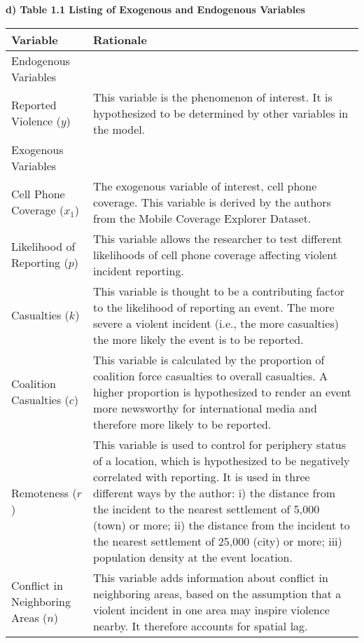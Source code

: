 \documentclass{report}
\begin{document}
\textbf{d) Table 1.1 Listing of Exogenous and Endogenous Variables}\\
\begin{tabular}{p{4cm}p{13cm} }
Variable & Rationale  \\
\hline
Endogenous Variables & \\
\hline
Reported Violence ($y$) & This variable is the phenomenon of interest. It is hypothesized to be determined by other variables in the model. \\

Exogenous Variables& \\
\hline

Cell Phone Coverage ($x_1$) & The exogenous variable of interest, cell phone coverage. This variable is derived by the authors from the Mobile Coverage Explorer Dataset. \\
Likelihood of Reporting ($p$) & This variable allows the researcher to test different likelihoods of cell phone coverage affecting violent incident reporting. \\
Casualties ($k$) & This variable is thought to be a contributing factor to the likelihood of reporting an event. The more severe a violent incident (i.e., the more casualties) the more likely the event is to be reported. \\
Coalition Casualties ($c$)  & This variable is calculated by the proportion of coalition force casualties to overall casualties. A higher proportion is hypothesized to render an event more newsworthy for international media and therefore more likely to be reported.\\

Remoteness ($r$) & This variable is used to control for periphery status of a location, which is hypothesized to be negatively correlated with reporting. It is used in three different ways by the author: i) the distance from the incident to the nearest settlement of 5,000 (town) or more; ii) the distance from the incident to the nearest settlement of 25,000 (city) or more; iii) population density at the event location. \\

Conflict in Neighboring Areas ($n$) &  This variable adds information about conflict in neighboring areas, based on the assumption that a violent incident in one area may inspire violence nearby. It therefore accounts for spatial lag. 

\end{tabular}
\end{document}
